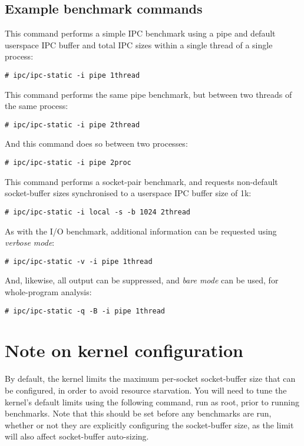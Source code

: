 \documentclass[a4paper,10pt]{article}
\begin{document}
\subsection*{Example benchmark commands}

This command performs a simple IPC benchmark using a pipe and default
userspace IPC buffer and total IPC sizes within a single thread of a single
process:

\begin{verbatim}
# ipc/ipc-static -i pipe 1thread
\end{verbatim}

\noindent
This command performs the same pipe benchmark, but between two threads of the
same process:

\begin{verbatim}
# ipc/ipc-static -i pipe 2thread
\end{verbatim}

\noindent
And this command does so between two processes:

\begin{verbatim}
# ipc/ipc-static -i pipe 2proc
\end{verbatim}

\noindent
This command performs a socket-pair benchmark, and requests non-default
socket-buffer sizes synchronised to a userspace IPC buffer size of 1k:

\begin{verbatim}
# ipc/ipc-static -i local -s -b 1024 2thread
\end{verbatim}

\noindent
As with the I/O benchmark, additional information can be requested using
\textit{verbose mode}:

\begin{verbatim}
# ipc/ipc-static -v -i pipe 1thread
\end{verbatim}

\noindent
And, likewise, all output can be suppressed, and \textit{bare mode} can be
used, for whole-program analysis:

\begin{verbatim}
# ipc/ipc-static -q -B -i pipe 1thread
\end{verbatim}

\section*{Note on kernel configuration}

By default, the kernel limits the maximum per-socket socket-buffer size that
can be configured, in order to avoid resource starvation.
You will need to tune the kernel's default limits using the following command,
run as root, prior to running benchmarks.
Note that this should be set before any benchmarks are run, whether or not
they are explicitly configuring the socket-buffer size, as the limit will also
affect socket-buffer auto-sizing.
\end{document}

